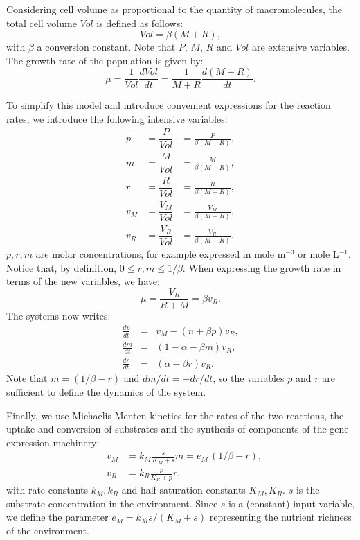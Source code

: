 \documentclass[10pt, conference]{ieeeconf}      %
\begin{document}
Considering cell volume as proportional to the quantity of macromolecules, the total cell volume $\mathit{Vol}$ is defined as follows:
\[
\mathit{Vol}=\beta (M+R),
\]
with $\beta$ a conversion constant. Note that $P$, $M$, $R$ and $\mathit{Vol}$ are extensive variables.
The growth rate of the population is given by:
\[
\mu = \frac{1}{\mathit{Vol}} \frac{d\mathit{Vol}}{dt} = \frac{1}{M+R}\frac{d(M+R)}{dt}.
\]

To simplify this model and introduce convenient expressions for the reaction rates, we introduce the following intensive variables:
\begin{eqnarray*}
p &= \dfrac{P}{\mathit{Vol}} &= \frac{P}{\beta (M+R)}, \\
m &= \dfrac{M}{\mathit{Vol}} &= \frac{M}{\beta (M+R)},\\
r &= \dfrac{R}{\mathit{Vol}} &= \frac{R}{\beta (M+R)},\\
v_M &= \dfrac{V_M}{\mathit{Vol}} &= \frac{V_M}{\beta (M+R)},\\
v_R &= \dfrac{V_R}{\mathit{Vol}} &= \frac{V_R}{\beta (M+R)}.
\end{eqnarray*}
$p,r,m$ are molar concentrations, for example expressed in mole m$^{-3}$ or mole L$^{-1}$.
Notice that, by definition, $0 \leq r, m \leq 1/\beta$.
When expressing the growth rate in terms of the new variables, we have:
\[
\mu = \frac{V_R}{R+M} = \beta v_R.
\]
The systems now writes:
\begin{eqnarray}
\frac{dp}{dt} &=& v_M - (n + \beta p) v_R, \label{eq:p} \\
\frac{dm}{dt} &=& (1-\alpha - \beta m) v_R, \label{eq:m} \\ 
\frac{dr}{dt} &=& (\alpha - \beta r) v_R. \label{eq:r}
\end{eqnarray}
Note that $m = (1/\beta - r)$ and $dm/dt = - dr/dt$, so the variables $p$ and $r$ are sufficient to define the dynamics of the system.

Finally, we use Michaelis-Menten kinetics for the rates of the two reactions, the uptake and conversion of substrates and the synthesis of components of the gene expression machinery:
\begin{eqnarray}
&v_M &= k_M \frac{s}{K_M +s} m = e_M \, (1/\beta -r), \\
&v_R &= k_R \frac{p}{K_R + p} r,
\end{eqnarray}
with rate constants $k_M, k_R$ and half-saturation constants $K_M, K_R$.
$s$ is the substrate concentration in the environment.
Since $s$ is a (constant) input variable, we define the parameter $e_M = k_M s / (K_M + s)$ representing the nutrient richness of the environment.
\end{document}
